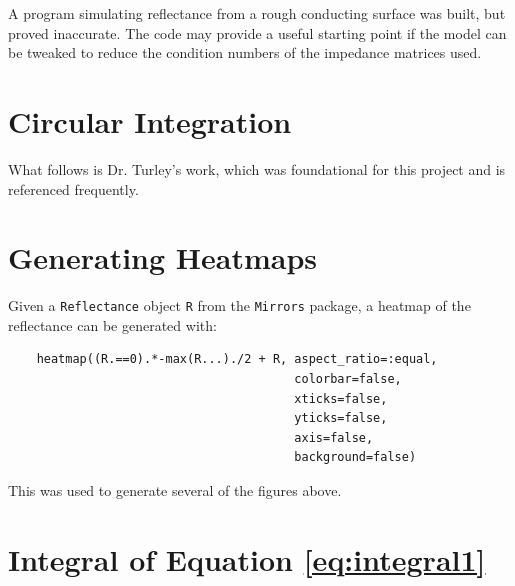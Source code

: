 \documentclass[etd,senior,noacknowledgments]{BYUPhys}
\begin{document}
A program simulating reflectance from a rough conducting surface was built, but proved inaccurate. The code may provide a useful starting point if the model can be tweaked to reduce the condition numbers of the impedance matrices used.









\begin{appendices}

  \chapter{Circular Integration}\label{chap:circular_integration}
  
  What follows is Dr. Turley's work, which was foundational for this project and is referenced frequently.
  
  
  
  
  
  \chapter{Generating Heatmaps}\label{chap:heatmap_code}
  
  Given a \texttt{Reflectance} object \texttt{R} from the \texttt{Mirrors} package, a heatmap of the reflectance can be generated with:
  
  \begin{verbatim}
    heatmap((R.==0).*-max(R...)./2 + R, aspect_ratio=:equal,
                                        colorbar=false,
                                        xticks=false,
                                        yticks=false,
                                        axis=false,
                                        background=false)
  \end{verbatim}
  
  This was used to generate several of the figures above.
  
  
  
  \chapter{Integral of Equation \ref{eq:integral1}}\label{chap:integral}
  

\end{appendices}
\end{document}
